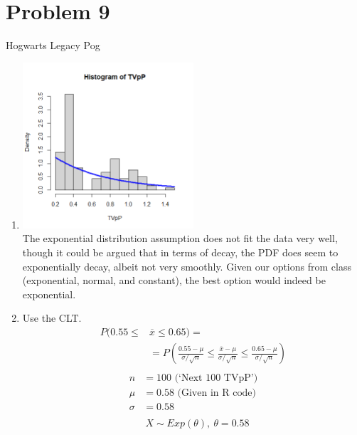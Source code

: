 \documentclass{article}
\begin{document}
\section*{Problem 9}
Hogwarts Legacy Pog
\begin{enumerate}[label=(\alph*)]
    \item \includegraphics[width=0.5\textwidth]{hogwarts.png} \\
          The exponential distribution assumption does not fit the data very well, though it could be argued that in terms of decay, the PDF does seem to exponentially decay, albeit not very smoothly.
          Given our options from class (exponential, normal, and constant), the best option would indeed be exponential.
    \item Use the CLT.
          \begin{align*}
              P(0.55 \leq & \overline{x}  \leq 0.65) =                                                                                                      \\
                          & = P(\frac{0.55 - \mu}{\sigma/\sqrt{n}} \leq \frac{\overline{x} - \mu}{\sigma/\sqrt{n}} \leq \frac{0.65 - \mu}{\sigma/\sqrt{n}}) \\
          \end{align*}
          \begin{align*}
              n      & = 100 \text{ (`Next 100 TVpP')}  \\
              \mu    & = 0.58 \text{ (Given in R code)} \\
              \sigma & = 0.58                           \\
          \end{align*}
          \begin{align*}
                           & X \sim        Exp(\theta),\ \theta = 0.58                                                                 \\

\end{align*}
\end{enumerate}
\end{document}
